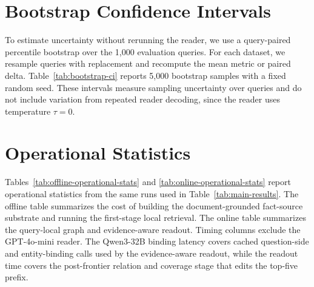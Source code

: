 \section{Bootstrap Confidence Intervals}
\label{app:bootstrap-ci}

To estimate uncertainty without rerunning the reader, we use a
query-paired percentile bootstrap over the 1{,}000 evaluation queries.
For each dataset, we resample queries with replacement and recompute
the mean metric or paired delta. Table~\ref{tab:bootstrap-ci} reports
5{,}000 bootstrap samples with a fixed random seed. These intervals
measure sampling uncertainty over queries and do not include variation
from repeated reader decoding, since the reader uses temperature
$\tau=0$.

\begin{table}[h]
\centering
\scriptsize
\setlength{\tabcolsep}{3pt}
\caption{Bootstrap confidence intervals for key main-table and
ablation comparisons. Values are percentages, and brackets give 95\%
percentile intervals. Positive deltas mean \methodname{} is higher
than the comparison system.}
\label{tab:bootstrap-ci}
\end{table}

\section{Operational Statistics}
\label{app:operational-stats}

Tables~\ref{tab:offline-operational-stats} and
\ref{tab:online-operational-stats} report operational statistics from
the same runs used in Table~\ref{tab:main-results}. The offline table
summarizes the cost of building the document-grounded fact-source
substrate and running the first-stage local retrieval. The online table
summarizes the query-local graph and evidence-aware readout. Timing
columns exclude the GPT-4o-mini reader. The Qwen3-32B binding latency
covers cached question-side and entity-binding calls used by the
evidence-aware readout, while the readout time covers the post-frontier
relation and coverage stage that edits the top-five prefix.

